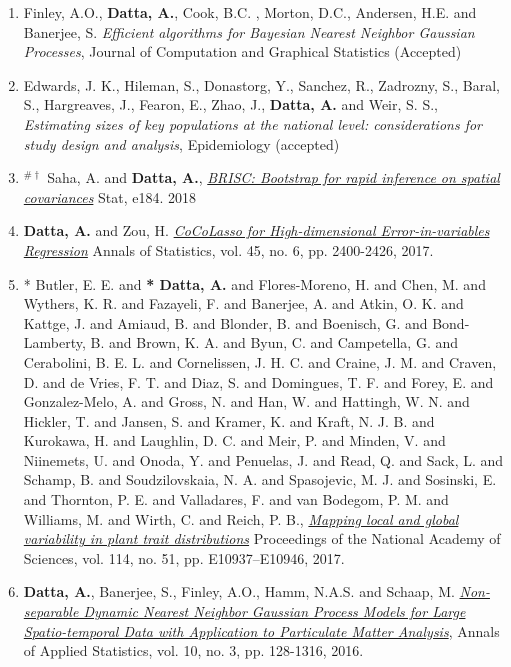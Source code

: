 \documentclass[11pt,a4paper,sans]{moderncv} %
\begin{document}
{\begin{enumerate}
\item \vskip 4mm Finley, A.O., \textbf{Datta, A.}, Cook, B.C. ,  Morton, D.C., Andersen, H.E. and Banerjee, S. {\em Efficient algorithms for Bayesian Nearest Neighbor Gaussian Processes}, Journal of Computation and Graphical Statistics (Accepted)	
	
\item \vskip 4mm Edwards, J. K., Hileman, S., Donastorg, Y., Sanchez, R., Zadrozny, S., Baral, S., Hargreaves, J., Fearon, E., Zhao, J., \textbf{Datta, A.} and Weir, S. S.,  {\em Estimating sizes of key populations at the national level: considerations for study design and analysis}, Epidemiology (accepted)

\item \vskip 4mm $^{\# \dagger}$ Saha, A. and \textbf{Datta, A.}, \href{https://onlinelibrary.wiley.com/doi/abs/10.1002/sta4.184}{\em BRISC: Bootstrap for rapid inference on spatial covariances} Stat, e184. 2018

\item \vskip 4mm \textbf{Datta, A.} and Zou, H. \href{https://projecteuclid.org/euclid.aos/1513328577}{\em CoCoLasso for High-dimensional Error-in-variables Regression} Annals of Statistics, vol. 45, no. 6, pp. 2400-2426, 2017.

\item \vskip 4mm * Butler, E. E. and \textbf{* Datta, A.} and Flores-Moreno, H. and Chen, M. and Wythers, K. R. and Fazayeli, F. and Banerjee, A. and Atkin, O. K. and Kattge, J. and Amiaud, B. and Blonder, B. and Boenisch, G. and Bond-Lamberty, B. and Brown, K. A. and Byun, C. and Campetella, G. and Cerabolini, B. E. L. and Cornelissen, J. H. C. and Craine, J. M. and Craven, D. and de Vries, F. T. and Diaz, S. and Domingues, T. F. and Forey, E. and Gonzalez-Melo, A. and Gross, N. and Han, W. and Hattingh, W. N. and Hickler, T. and Jansen, S. and Kramer, K. and Kraft, N. J. B. and Kurokawa, H. and Laughlin, D. C. and Meir, P. and Minden, V. and Niinemets, U. and Onoda, Y. and Penuelas, J. and Read, Q. and Sack, L. and Schamp, B. and Soudzilovskaia, N. A. and Spasojevic, M. J. and Sosinski, E. and Thornton, P. E. and Valladares, F. and van Bodegom, P. M. and Williams, M. and Wirth, C. and Reich, P. B.,  \href{http://www.pnas.org/content/114/51/E10937}{\em Mapping local and global variability in plant trait distributions} Proceedings of the National Academy of Sciences, vol. 114, no. 51, pp. E10937--E10946, 2017.

\item \vskip 4mm \textbf{Datta, A.}, Banerjee, S., Finley, A.O., Hamm, N.A.S. and Schaap, M.  \href{https://projecteuclid.org/euclid.aoas/1475069608}{\em Non-separable Dynamic Nearest Neighbor Gaussian Process Models for Large Spatio-temporal Data with Application to Particulate Matter Analysis}, Annals of Applied Statistics, vol. 10, no. 3, pp. 128-1316, 2016.


\end{enumerate}}
\end{document}
